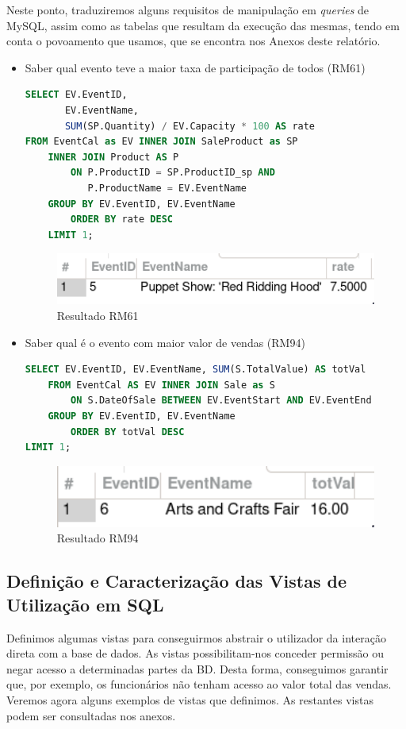 \documentclass[a4paper,12pt]{scrreprt}
\begin{document}
Neste ponto, traduziremos alguns requisitos de manipulação em \textit{queries} de MySQL, assim como as tabelas que resultam da execução das mesmas, tendo em conta o povoamento que usamos, que se encontra nos Anexos deste relatório.

\begin{itemize}
    \item{Saber qual evento teve a maior taxa de participação de todos (RM61)}
    \begin{lstlisting}[language=sql]
SELECT EV.EventID, 
       EV.EventName, 
       SUM(SP.Quantity) / EV.Capacity * 100 AS rate
FROM EventCal as EV INNER JOIN SaleProduct as SP
    INNER JOIN Product AS P
        ON P.ProductID = SP.ProductID_sp AND
           P.ProductName = EV.EventName
    GROUP BY EV.EventID, EV.EventName
        ORDER BY rate DESC
    LIMIT 1;
    \end{lstlisting}
    \begin{figure}[H]
            \centering
            \includegraphics[width=4.75in]{images/querie1.png}
            \caption{Resultado RM61}
        \end{figure}
    
    \item{Saber qual é o evento com maior valor de vendas (RM94)}
    \begin{lstlisting}[language=sql]
SELECT EV.EventID, EV.EventName, SUM(S.TotalValue) AS totVal
	FROM EventCal AS EV INNER JOIN Sale as S
		ON S.DateOfSale BETWEEN EV.EventStart AND EV.EventEnd
	GROUP BY EV.EventID, EV.EventName
		ORDER BY totVal DESC
LIMIT 1;
    \end{lstlisting}
    \begin{figure}[H]
            \centering
            \includegraphics[width=4.75in]{images/querie2.png}
            \caption{Resultado RM94}
        \end{figure}
\end{itemize}

\subsection{Definição e Caracterização das Vistas de Utilização em SQL}
Definimos algumas vistas para conseguirmos abstrair o utilizador da interação direta com a base de dados. As vistas possibilitam-nos conceder permissão ou negar acesso a determinadas partes da BD. Desta forma, conseguimos garantir que, por exemplo, os funcionários não tenham acesso ao valor total das vendas.
Veremos agora alguns exemplos de vistas que definimos.
As restantes vistas podem ser consultadas nos anexos.
\end{document}
